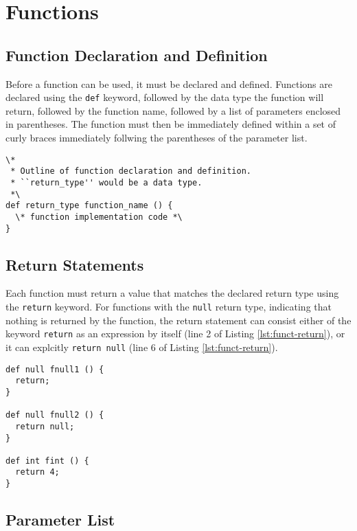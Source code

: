 \documentclass{article}
\newcommand{\code}[1]{\texttt{#1}} %
\begin{document}
\section{Functions}

\subsection{Function Declaration and Definition}

Before a function can be used, it must be declared and defined. Functions are declared using the \code{def} keyword, followed by the data type the function will return, followed by the function name, followed by a list of parameters enclosed in parentheses. The function must then be immediately defined within a set of curly braces immediately follwing the parentheses of the parameter list. 

\begin{lstlisting}[language=pltLang, caption=Function declaration and definition., label=lst:funct-def]
\* 
 * Outline of function declaration and definition.
 * ``return_type'' would be a data type.
 *\
def return_type function_name () {
  \* function implementation code *\
}
\end{lstlisting}

\subsection{Return Statements}

Each function must return a value that matches the declared return type using the \code{return} keyword. For functions with the \code{null} return type, indicating that nothing is returned by the function, the return statement can consist either of the keyword \code{return} as an expression by itself (line 2 of Listing \ref{lst:funct-return}), or it can explcitly \code{return null} (line 6 of Listing \ref{lst:funct-return}).

\begin{lstlisting}[language=pltLang, caption=Return statements of functions., label=lst:funct-return]
def null fnull1 () {
  return;
}

def null fnull2 () {
  return null;
}

def int fint () {
  return 4;
}
\end{lstlisting}

\subsection{Parameter List}
\end{document}
